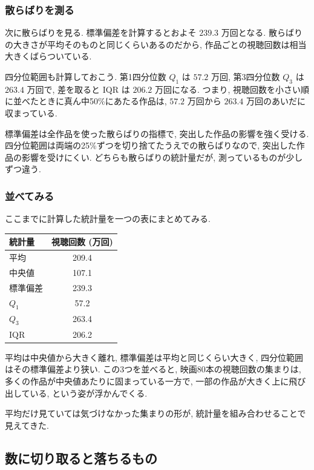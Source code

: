     \subsubsection*{散らばりを測る}

    次に散らばりを見る.
    標準偏差を計算するとおよそ $239.3$ 万回となる.
    散らばりの大きさが平均そのものと同じくらいあるのだから, 作品ごとの視聴回数は相当大きくばらついている.

    四分位範囲も計算しておこう.
    第1四分位数 $Q_1$ は $57.2$ 万回, 第3四分位数 $Q_3$ は $263.4$ 万回で, 差を取ると $\mathrm{IQR}$ は $206.2$ 万回になる.
    つまり, 視聴回数を小さい順に並べたときに真ん中50\%にあたる作品は, $57.2$ 万回から $263.4$ 万回のあいだに収まっている.

    標準偏差は全作品を使った散らばりの指標で, 突出した作品の影響を強く受ける.
    四分位範囲は両端の25\%ずつを切り捨てたうえでの散らばりなので, 突出した作品の影響を受けにくい.
    どちらも散らばりの統計量だが, 測っているものが少しずつ違う.

    \subsubsection*{並べてみる}

    ここまでに計算した統計量を一つの表にまとめてみる.

    \begin{center}
      \begin{tabular}{l|c}
        統計量 & 視聴回数 (万回) \\ \hline
        平均 & 209.4 \\
        中央値 & 107.1 \\
        標準偏差 & 239.3 \\
        $Q_1$ & 57.2 \\
        $Q_3$ & 263.4 \\
        $\mathrm{IQR}$ & 206.2 \\
      \end{tabular}
    \end{center}

    平均は中央値から大きく離れ, 標準偏差は平均と同じくらい大きく, 四分位範囲はその標準偏差より狭い.
    この3つを並べると, 映画80本の視聴回数の集まりは, 多くの作品が中央値あたりに固まっている一方で, 一部の作品が大きく上に飛び出している, という姿が浮かんでくる.

    平均だけ見ていては気づけなかった集まりの形が, 統計量を組み合わせることで見えてきた.


  \subsection{数に切り取ると落ちるもの}


